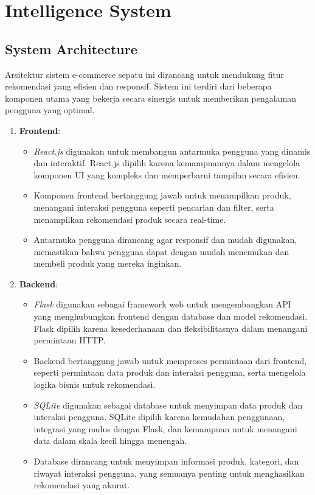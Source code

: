 \documentclass[journal,article,submit,pdftex,moreauthors]{Definitions/mdpi}
\begin{document}
\section{Intelligence System}

\subsection{System Architecture}
Arsitektur sistem e-commerce sepatu ini dirancang untuk mendukung fitur rekomendasi yang efisien dan responsif. Sistem ini terdiri dari beberapa komponen utama yang bekerja secara sinergis untuk memberikan pengalaman pengguna yang optimal.

\begin{enumerate}
    \item \textbf{Frontend}:
    \begin{itemize}
        \item \textit{React.js} digunakan untuk membangun antarmuka pengguna yang dinamis dan interaktif. React.js dipilih karena kemampuannya dalam mengelola komponen UI yang kompleks dan memperbarui tampilan secara efisien.
        \item Komponen frontend bertanggung jawab untuk menampilkan produk, menangani interaksi pengguna seperti pencarian dan filter, serta menampilkan rekomendasi produk secara real-time.
        \item Antarmuka pengguna dirancang agar responsif dan mudah digunakan, memastikan bahwa pengguna dapat dengan mudah menemukan dan membeli produk yang mereka inginkan.
    \end{itemize}

    \item \textbf{Backend}:
    \begin{itemize}
        \item \textit{Flask} digunakan sebagai framework web untuk mengembangkan API yang menghubungkan frontend dengan database dan model rekomendasi. Flask dipilih karena kesederhanaan dan fleksibilitasnya dalam menangani permintaan HTTP.
        \item Backend bertanggung jawab untuk memproses permintaan dari frontend, seperti permintaan data produk dan interaksi pengguna, serta mengelola logika bisnis untuk rekomendasi.
        \item \textit{SQLite} digunakan sebagai database untuk menyimpan data produk dan interaksi pengguna. SQLite dipilih karena kemudahan penggunaan, integrasi yang mulus dengan Flask, dan kemampuan untuk menangani data dalam skala kecil hingga menengah.
        \item Database dirancang untuk menyimpan informasi produk, kategori, dan riwayat interaksi pengguna, yang semuanya penting untuk menghasilkan rekomendasi yang akurat.
    \end{itemize}


\end{enumerate}
\end{document}
